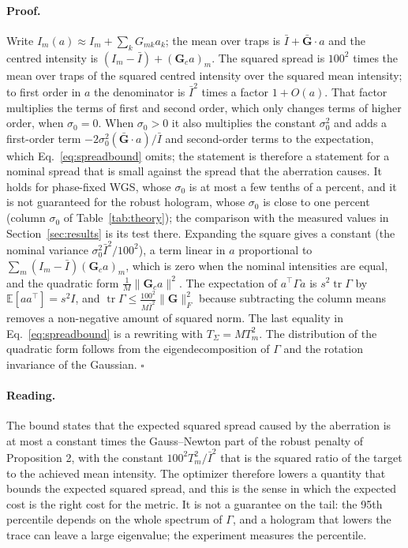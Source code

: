 \paragraph{Proof.} Write $I_m(a)\approx I_m+\sum_kG_{mk}a_k$; the mean over traps is $\bar I+\bar{\mathbf G}\!\cdot\!a$ and the centred intensity is $(I_m-\bar I)+(\mathbf G_c a)_m$. The squared spread is $100^2$ times the mean over traps of the squared centred intensity over the squared mean intensity; to first order in $a$ the denominator is $\bar I^2$ times a factor $1+O(a)$. That factor multiplies the terms of first and second order, which only changes terms of higher order, when $\sigma_0=0$. When $\sigma_0>0$ it also multiplies the constant $\sigma_0^2$ and adds a first-order term $-2\sigma_0^2(\bar{\mathbf G}\!\cdot\!a)/\bar I$ and second-order terms to the expectation, which Eq.~\eqref{eq:spreadbound} omits; the statement is therefore a statement for a nominal spread that is small against the spread that the aberration causes. It holds for phase-fixed WGS, whose $\sigma_0$ is at most a few tenths of a percent, and it is not guaranteed for the robust hologram, whose $\sigma_0$ is close to one percent (column $\sigma_0$ of Table~\ref{tab:theory}); the comparison with the measured values in Section~\ref{sec:results} is its test there.
Expanding the square gives a constant (the nominal variance $\sigma_0^2\bar I^2/100^2$), a term linear in $a$ proportional to $\sum_m(I_m-\bar I)(\mathbf G_ca)_m$, which is zero when the nominal intensities are equal, and the quadratic form $\frac1M\|\mathbf G_ca\|^2$. The expectation of $a^{\top}\Gamma a$ is $s^2\operatorname{tr}\Gamma$ by $\mathbb E[aa^{\top}]=s^2I$, and
$\operatorname{tr}\Gamma\le\frac{100^2}{M\bar I^2}\|\mathbf G\|_F^2$ because subtracting the column means removes a non-negative amount of squared norm. The last equality in Eq.~\eqref{eq:spreadbound} is a rewriting with $T_\Sigma=MT_m^2$. The distribution of the quadratic form follows from the eigendecomposition of $\Gamma$ and the rotation invariance of the Gaussian. \hfill$\square$

\paragraph{Reading.} The bound states that the expected squared spread caused by the aberration is at most a constant times the Gauss--Newton part of the robust penalty of Proposition 2, with the constant $100^2T_m^2/\bar I^2$ that is the squared ratio of the target to the achieved mean intensity. The optimizer therefore lowers a quantity that bounds the expected squared spread, and this is the sense in which the expected cost is the right
cost for the metric. It is not a guarantee on the tail: the 95th percentile depends on the whole spectrum of $\Gamma$, and a hologram that lowers the trace can leave a large eigenvalue; the experiment measures the percentile.

